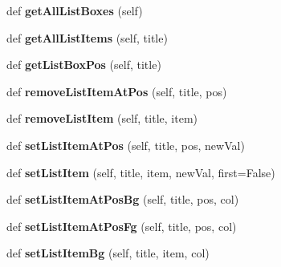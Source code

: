 \begin{DoxyCompactItemize}
def {\bfseries get\+All\+List\+Boxes} (self)
\item 
\mbox{\label{class_python_01_g_u_i_1_1appjar_1_1gui_a374f1eb9525b347fdf12ad1bca5e31f3}} 
def {\bfseries get\+All\+List\+Items} (self, title)
\item 
\mbox{\label{class_python_01_g_u_i_1_1appjar_1_1gui_a8d365e83600fcef44ccb611a9774cdd0}} 
def {\bfseries get\+List\+Box\+Pos} (self, title)
\item 
\mbox{\label{class_python_01_g_u_i_1_1appjar_1_1gui_a11451569fe48886e3fc934b1e77c1660}} 
def {\bfseries remove\+List\+Item\+At\+Pos} (self, title, pos)
\item 
\mbox{\label{class_python_01_g_u_i_1_1appjar_1_1gui_a32cecefc6b505a4098c39eb82f9b98a5}} 
def {\bfseries remove\+List\+Item} (self, title, item)
\item 
\mbox{\label{class_python_01_g_u_i_1_1appjar_1_1gui_a30b6e9cfe344249f7f3ad99b6e2510fd}} 
def {\bfseries set\+List\+Item\+At\+Pos} (self, title, pos, new\+Val)
\item 
\mbox{\label{class_python_01_g_u_i_1_1appjar_1_1gui_a97f33e32f86d635562279433e82cd62c}} 
def {\bfseries set\+List\+Item} (self, title, item, new\+Val, first=False)
\item 
\mbox{\label{class_python_01_g_u_i_1_1appjar_1_1gui_ad990fff531a4b88944d9aedc11ee2af5}} 
def {\bfseries set\+List\+Item\+At\+Pos\+Bg} (self, title, pos, col)
\item 
\mbox{\label{class_python_01_g_u_i_1_1appjar_1_1gui_aa01f620d2067d09398b4cf58902f6e45}} 
def {\bfseries set\+List\+Item\+At\+Pos\+Fg} (self, title, pos, col)
\item 
\mbox{\label{class_python_01_g_u_i_1_1appjar_1_1gui_a5a379d3187257a2cb07a0b03073ecb99}} 
def {\bfseries set\+List\+Item\+Bg} (self, title, item, col)

\end{DoxyCompactItemize}
